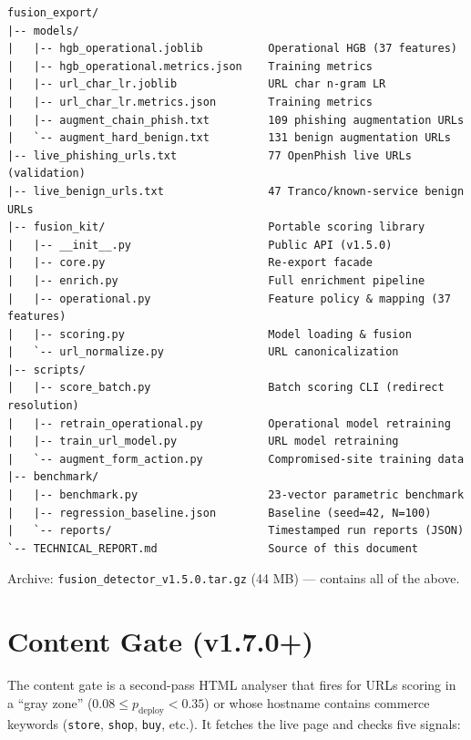 \documentclass[11pt,a4paper]{article}
\newcommand{\code}[1]{\texttt{#1}}
\begin{document}
\begin{lstlisting}
fusion_export/
|-- models/
|   |-- hgb_operational.joblib          Operational HGB (37 features)
|   |-- hgb_operational.metrics.json    Training metrics
|   |-- url_char_lr.joblib              URL char n-gram LR
|   |-- url_char_lr.metrics.json        Training metrics
|   |-- augment_chain_phish.txt         109 phishing augmentation URLs
|   `-- augment_hard_benign.txt         131 benign augmentation URLs
|-- live_phishing_urls.txt              77 OpenPhish live URLs (validation)
|-- live_benign_urls.txt                47 Tranco/known-service benign URLs
|-- fusion_kit/                         Portable scoring library
|   |-- __init__.py                     Public API (v1.5.0)
|   |-- core.py                         Re-export facade
|   |-- enrich.py                       Full enrichment pipeline
|   |-- operational.py                  Feature policy & mapping (37 features)
|   |-- scoring.py                      Model loading & fusion
|   `-- url_normalize.py                URL canonicalization
|-- scripts/
|   |-- score_batch.py                  Batch scoring CLI (redirect resolution)
|   |-- retrain_operational.py          Operational model retraining
|   |-- train_url_model.py              URL model retraining
|   `-- augment_form_action.py          Compromised-site training data
|-- benchmark/
|   |-- benchmark.py                    23-vector parametric benchmark
|   |-- regression_baseline.json        Baseline (seed=42, N=100)
|   `-- reports/                        Timestamped run reports (JSON)
`-- TECHNICAL_REPORT.md                 Source of this document
\end{lstlisting}

Archive: \code{fusion\_detector\_v1.5.0.tar.gz} (44 MB) --- contains
all of the above.

\section{Content Gate (v1.7.0+)}

The content gate is a second-pass HTML analyser that fires for URLs
scoring in a ``gray zone'' ($0.08 \leq p_{\text{deploy}} < 0.35$) or
whose hostname contains commerce keywords (\code{store}, \code{shop},
\code{buy}, etc.). It fetches the live page and checks five signals:
\end{document}
